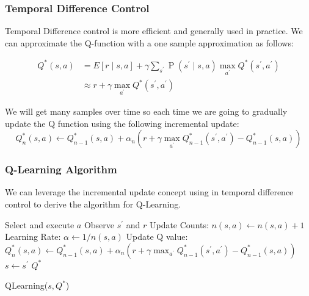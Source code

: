 \documentclass[12pt]{article}
\begin{document}
        \subsubsection{Temporal Difference Control}
            Temporal Difference control is more efficient and generally used in practice. We can approximate the
            Q-function with a one sample approximation as follows:

            \begin{align*}
            Q^{*}(s, a) &=E[r \mid s, a]+\gamma \sum_{s^{\prime}} \operatorname{P}\left(s^{\prime} \mid s, a\right) \max _{a^{\prime}} Q^{*}\left(s^{\prime}, a^{\prime}\right) \\
            & \approx r+\gamma \max _{a^{\prime}} Q^{*}\left(s^{\prime}, a^{\prime}\right)
            \end{align*}
            
            We will get many samples over time so each time we are going to gradually update the Q function using the
            following incremental update:
            $$ Q_{n}^{*}(s, a) \leftarrow Q_{n-1}^{*}(s, a)+\alpha_{n}\left(r+\gamma \max _{a^{\prime}} Q_{n-1}^{*}\left(s^{\prime}, a^{\prime}\right)-Q_{n-1}^{*}(s, a)\right)$$
        
        \subsubsection{Q-Learning Algorithm} \label{QLearning}
            We can leverage the incremental update concept using in temporal difference control to derive the algorithm
            for Q-Learning.
            
            \begin{algorithm}[H] \label{QLearningAlgo}
                \SetAlgoLined
                 {
                    Select and execute $a$ \;
                    Observe $s^{\prime}$ and $r$\;
                    Update Counts: $n(s, a) \gets n(s, a) + 1$ \;
                    Learning Rate: $\alpha \gets 1/n(s,a)$ \;
                    Update Q value: $Q_{n}^{*}(s, a) \leftarrow Q_{n-1}^{*}(s, a)+\alpha_{n}\left(r+\gamma \max
                    _{a^{\prime}} Q_{n-1}^{*}\left(s^{\prime}, a^{\prime}\right)-Q_{n-1}^{*}(s, a)\right)$ \;
                    $s \gets s^{\prime}$ \;
                }
                \Return $Q^*$
                \caption{QLearning($s, Q^*$)}
            \end{algorithm}
\end{document}
